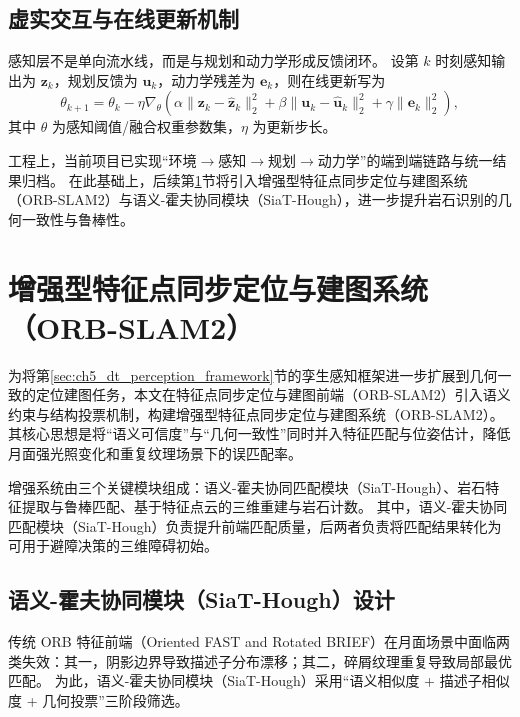 \documentclass[UTF8,zihao=-4,a4paper,oneside,openany]{ctexrep}
\numberwithin{equation}{chapter}
\theoremstyle{plain}
\theoremstyle{definition}
\begin{document}
\subsection{虚实交互与在线更新机制}

感知层不是单向流水线，而是与规划和动力学形成反馈闭环。
设第 $k$ 时刻感知输出为 $\mathbf{z}_k$，规划反馈为 $\mathbf{u}_k$，动力学残差为 $\mathbf{e}_k$，则在线更新写为
\begin{equation}
\theta_{k+1}=\theta_k-\eta\nabla_{\theta}
\left(
\alpha\|\mathbf{z}_k-\hat{\mathbf{z}}_k\|_2^2+
\beta\|\mathbf{u}_k-\hat{\mathbf{u}}_k\|_2^2+
\gamma\|\mathbf{e}_k\|_2^2
\right),
\label{eq:ch5_online_update}
\end{equation}
其中 $\theta$ 为感知阈值/融合权重参数集，$\eta$ 为更新步长。

工程上，当前项目已实现“环境$\rightarrow$感知$\rightarrow$规划$\rightarrow$动力学”的端到端链路与统一结果归档。
在此基础上，后续第\ref{sec:ch5_orbslam}节将引入增强型特征点同步定位与建图系统（ORB-SLAM2）与语义-霍夫协同模块（SiaT-Hough），进一步提升岩石识别的几何一致性与鲁棒性。

\section{增强型特征点同步定位与建图系统（ORB-SLAM2）}
\label{sec:ch5_orbslam}

为将第\ref{sec:ch5_dt_perception_framework}节的孪生感知框架进一步扩展到几何一致的定位建图任务，本文在特征点同步定位与建图前端（ORB-SLAM2）引入语义约束与结构投票机制，构建增强型特征点同步定位与建图系统（ORB-SLAM2）。
其核心思想是将“语义可信度”与“几何一致性”同时并入特征匹配与位姿估计，降低月面强光照变化和重复纹理场景下的误匹配率。

增强系统由三个关键模块组成：语义-霍夫协同匹配模块（SiaT-Hough）、岩石特征提取与鲁棒匹配、基于特征点云的三维重建与岩石计数。
其中，语义-霍夫协同匹配模块（SiaT-Hough）负责提升前端匹配质量，后两者负责将匹配结果转化为可用于避障决策的三维障碍初始。

\subsection{语义-霍夫协同模块（SiaT-Hough）设计}
\label{subsec:ch5_siat_hough}

传统 ORB 特征前端（Oriented FAST and Rotated BRIEF）在月面场景中面临两类失效：其一，阴影边界导致描述子分布漂移；其二，碎屑纹理重复导致局部最优匹配。
为此，语义-霍夫协同模块（SiaT-Hough）采用“语义相似度 + 描述子相似度 + 几何投票”三阶段筛选。
\end{document}

